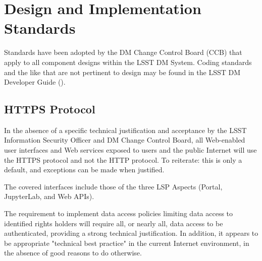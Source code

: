 \section{Design and Implementation Standards}\label{design-implementation-standards}

Standards have been adopted by the DM Change Control Board (CCB) that apply to
all component designs within the LSST DM System.  Coding standards and the like
that are not pertinent to design may be found in the LSST DM Developer Guide
(\citep{DevGuide}).

\subsection{HTTPS Protocol}

In the absence of a specific technical justification and acceptance by the LSST
Information Security Officer and DM Change Control Board, all Web-enabled user
interfaces and Web services exposed to users and the public Internet will use
the HTTPS protocol and not the HTTP protocol.  To reiterate: this is only a
default, and exceptions can be made when justified.

The covered interfaces include those of the three LSP Aspects (Portal,
JupyterLab, and Web APIs).

The requirement to implement data access policies limiting data access to
identified rights holders will require all, or nearly all, data access to be
authenticated, providing a strong technical justification.  In addition, it
appears to be appropriate "technical best practice" in the current Internet
environment, in the absence of good reasons to do otherwise.
